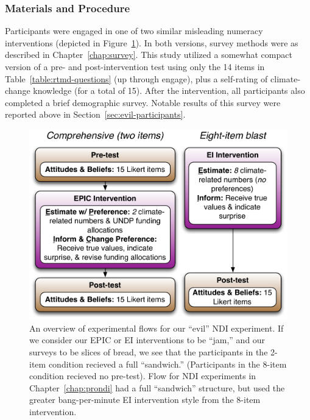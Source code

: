 \subsubsection{Materials and Procedure}

Participants were engaged in one of two similar misleading numeracy
interventions (depicted in Figure~\ref{fig:evil-flow}). In both versions, survey methods were as described in
Chapter~\ref{chap:survey}. This study utilized a somewhat compact version of a
pre- and post-intervention test using only the 14 items in
Table~\ref{table:rtmd-questions} (up through \textsf{engage}), plus a
self-rating of climate-change knowledge (for a total of 15).  
After the intervention, all participants also completed a brief demographic
survey. Notable results of this survey were reported above in
Section~\ref{sec:evil-participants}.

\begin{figure}[h]
    \includegraphics[width=6.5in]{evil-ndi-survey-flow.pdf}
    \caption{An overview of experimental flows for our “evil” NDI experiment. If
        we consider our EPIC or EI interventions to be “jam,” and our surveys to
        be slices of bread, we see that the participants in the 2-item condition
        recieved a full “sandwich.” (Participants in the 8-item condition
        recieved no pre-test).  Flow for NDI experiments in
        Chapter~\ref{chap:prondi} had a full “sandwich” structure, but used the
        greater bang-per-minute EI intervention style from the 8-item
        intervention.}
    \label{fig:evil-flow}
\end{figure}

